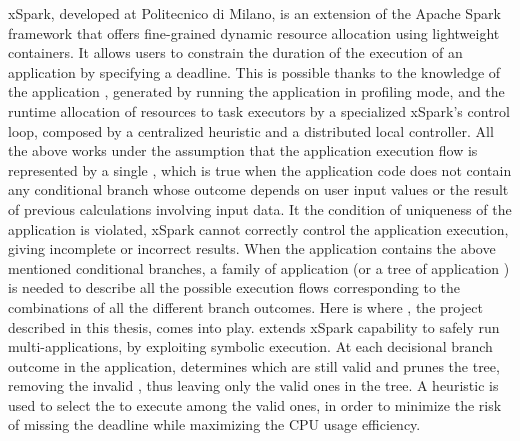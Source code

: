 xSpark, developed at Politecnico di Milano, is an extension of the Apache Spark framework that offers fine-grained dynamic resource allocation using lightweight containers. It allows users to constrain the duration of the execution of an application by specifying a deadline. This is possible thanks to the knowledge of the application \plan, generated by running the application in profiling mode, and the runtime allocation of resources to task executors by a specialized xSpark’s control loop, composed by a centralized heuristic and a distributed local controller. All the above works under the assumption that the application execution flow is represented by a single \plan, which is true when the application code does not contain any conditional branch whose outcome depends on user input values or the result of previous calculations involving input data. It the  condition of uniqueness of the application \plan is violated, xSpark cannot correctly control the application execution, giving incomplete or incorrect results. When the application contains the above mentioned conditional branches, a family of application \plans (or a tree of application \plans) is needed to describe all the possible execution flows corresponding to the combinations of all the different branch outcomes. Here is where \tool, the project described in this thesis, comes into play. \tool extends xSpark capability to safely run multi-\plan applications, by exploiting symbolic execution. At each decisional branch outcome in the application, \tool determines which \plans are still valid and prunes the \plans tree, removing the invalid \plans, thus leaving only the valid ones in the \plans tree. A heuristic is used to select the \plan to execute among the valid ones, in order to minimize the risk of missing the deadline while maximizing the CPU usage efficiency.
